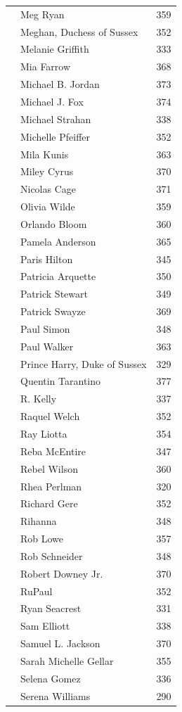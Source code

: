 \documentclass{article}
\begin{document}
{\begin{longtable}{p{}p{}r}
 & Meg Ryan & 359 \\
 & Meghan, Duchess of Sussex & 352 \\
 & Melanie Griffith & 333 \\
 & Mia Farrow & 368 \\
 & Michael B. Jordan & 373 \\
 & Michael J. Fox & 374 \\
 & Michael Strahan & 338 \\
 & Michelle Pfeiffer & 352 \\
 & Mila Kunis & 363 \\
 & Miley Cyrus & 370 \\
 & Nicolas Cage & 371 \\
 & Olivia Wilde & 359 \\
 & Orlando Bloom & 360 \\
 & Pamela Anderson & 365 \\
 & Paris Hilton & 345 \\
 & Patricia Arquette & 350 \\
 & Patrick Stewart & 349 \\
 & Patrick Swayze & 369 \\
 & Paul Simon & 348 \\
 & Paul Walker & 363 \\
 & Prince Harry, Duke of Sussex & 329 \\
 & Quentin Tarantino & 377 \\
 & R. Kelly & 337 \\
 & Raquel Welch & 352 \\
 & Ray Liotta & 354 \\
 & Reba McEntire & 347 \\
 & Rebel Wilson & 360 \\
 & Rhea Perlman & 320 \\
 & Richard Gere & 352 \\
 & Rihanna & 348 \\
 & Rob Lowe & 357 \\
 & Rob Schneider & 348 \\
 & Robert Downey Jr. & 370 \\
 & RuPaul & 352 \\
 & Ryan Seacrest & 331 \\
 & Sam Elliott & 338 \\
 & Samuel L. Jackson & 370 \\
 & Sarah Michelle Gellar & 355 \\
 & Selena Gomez & 336 \\
 & Serena Williams & 290 \\

\end{longtable}}
\end{document}
